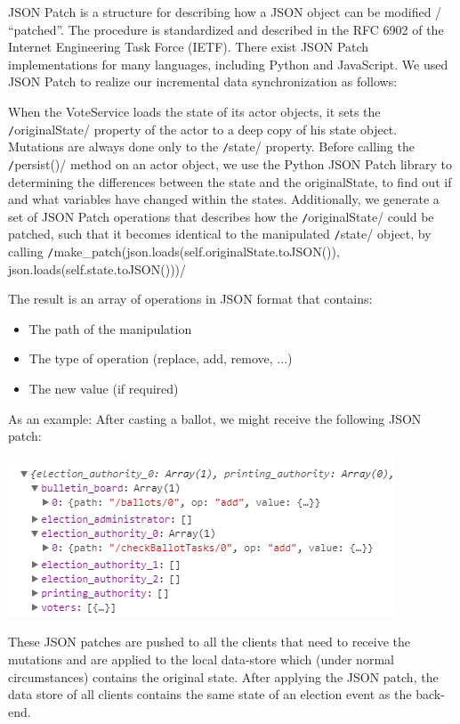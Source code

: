JSON Patch is a structure for describing how a JSON object can be modified / "`patched"'. The procedure is standardized and described in the RFC 6902 of the Internet Engineering Task Force (IETF). There exist JSON Patch implementations for many languages, including Python and JavaScript. We used JSON Patch to realize our incremental data synchronization as follows:

When the VoteService loads the state of its actor objects, it sets the \texttt/originalState/ property of the actor to a deep copy of his state object. Mutations are always done only to the \texttt/state/ property. Before calling the \texttt/persist()/ method on an actor object, we use the Python JSON Patch library to determining the differences between the state and the originalState, to find out if and what variables have changed within the states. Additionally, we generate a set of JSON Patch operations that describes how the \texttt/originalState/ could be patched, such that it becomes identical to the manipulated \texttt/state/ object, by calling 
\texttt/make_patch(json.loads(self.originalState.toJSON()), json.loads(self.state.toJSON()))/

The result is an array of operations in JSON format that contains:
\begin{itemize}
	\item The path of the manipulation
	\item The type of operation (replace, add, remove, ...)
	\item The new value (if required)
\end{itemize}

As an example: After casting a ballot, we might receive the following JSON patch:

\begin{center}
\includegraphics[scale=1]{assets/jsonpatchexample.png}
\label{JSON Patch example}%
\end{center}
These JSON patches are pushed to all the clients that need to receive the mutations and are applied to the local data-store which (under normal circumstances) contains the original state. After applying the JSON patch, the data store of all clients contains the same state of an election event as the back-end.


